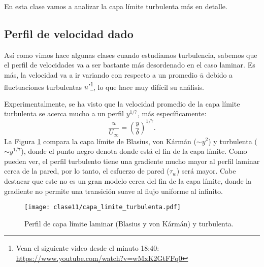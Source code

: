 En esta clase vamos a analizar la capa límite turbulenta más en detalle.

\subsection*{Perfil de velocidad dado}

Así como vimos hace algunas clases cuando estudiamos turbulencia, sabemos que el perfil de velocidades va a ser bastante más desordenado en el caso laminar.
Es más, la velocidad va a ir variando con respecto a un promedio $\overline{u}$ debido a fluctuaciones turbulentas $u'$\footnote{Vean el siguiente video desde el minuto 18:40: \url{https://www.youtube.com/watch?v=wMxK2GtFFq0}}, lo que hace muy difícil su análisis.

Experimentalmente, se ha visto que la velocidad promedio de la capa límite turbulenta se acerca mucho a un perfil $y^{1/7}$, más específicamente:
%
\begin{equation}\label{eq:perfil_turbulento}
\frac{u}{U_\infty} = \left(\frac{y}{\delta}\right)^{1/7}.
\end{equation}
%
La Figura \ref{fig:capa_limite_turbulenta} compara la capa límite de Blasius, von Kármán ($\sim y^2$) y turbulenta ($\sim y^{1/7}$), donde el punto negro denota donde está el fin de la capa límite. Como pueden ver, el perfil turbulento tiene una gradiente mucho mayor al perfil laminar cerca de la pared, por lo tanto, el esfuerzo de pared ($\tau_w$) será mayor.
Cabe destacar que este no es un gran modelo cerca del fin de la capa límite, donde la gradiente no permite una transición suave al flujo uniforme al infinito.
%
\begin{figure}
\centering
\texttt{[image: clase11/capa\_limite\_turbulenta.pdf]}
\caption{Perfil de capa límite laminar (Blasius y von Kármán) y turbulenta.}
\label{fig:capa_limite_turbulenta}
\end{figure}

